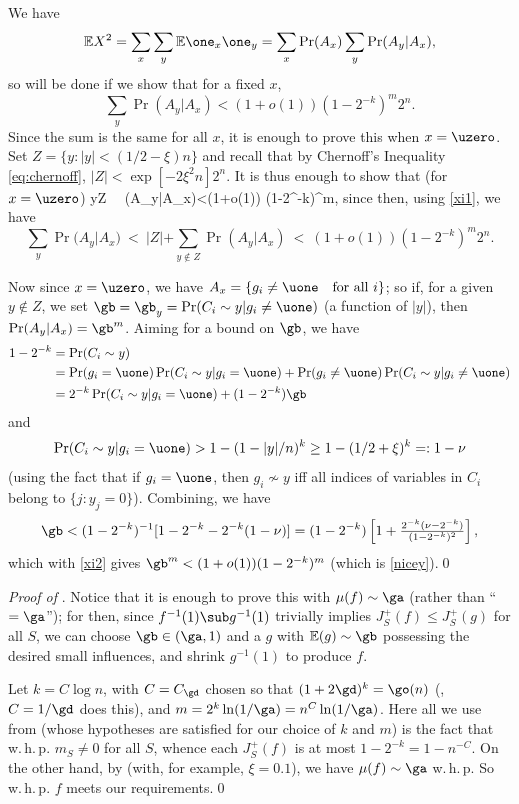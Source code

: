 We have
$$
\mathbb E  X^2 = \sum_x\sum_y\mathbb E  \one_x\one_y =\sum_x\Pr(A_x)\sum_y\Pr(A_y|A_x),
$$
so will be done if we show that for a fixed $x$,
$$ 
\sum_y\Pr(A_y|A_x) <(1+o(1)) (1-2^{-k})^m2^n.
$$ 
Since the sum is the same for all $x$, it is enough %
to prove this when $x=\uzero$.
Set $Z=\{y:|y|<(1/2-\xi)n\}$ and recall 
%
that by Chernoff's Inequality \eqref{eq:chernoff}, 
%
%
%
%
$|Z|<\exp[-2\xi^2n]2^n$.
It is thus enough to show that (for $x=\uzero$)
y\not\in Z ~\Ra~\Pr(A_y|A_x)<(1+o(1)) (1-2^{-k})^m,
\enq
since then, using \eqref{xi1}, we have
$$
\sum_y\Pr(A_y|A_x) ~<~ |Z| + \sum_{y\not\in Z}\Pr(A_y|A_x)
~<~ (1+o(1)) (1-2^{-k})^m2^n.
$$


Now since $x=\uzero$, we have
%
$A_x =\{g_i\neq \uone ~~ \text{ for all } i\}$; %
%
%
so 
if, for a given $y\not\in Z$, we set
$\gb =\gb_y=\Pr(C_i\sim y|g_i\neq \uone)$
(a function of $|y|$),
then $\Pr(A_y|A_x) = \gb^m$.
Aiming for a bound on $\gb$, we have
%
\begin{align*}
1-2^{-k}&=\Pr(C_i\sim y) \\
&=
\Pr(g_i=\uone)\Pr(C_i\sim y|g_i=\uone)
+ \Pr(g_i\neq\uone)\Pr(C_i\sim y|g_i\neq \uone)\\
&= 2^{-k}\Pr(C_i\sim y|g_i=\uone) +(1-2^{-k})\gb
\end{align*}
and
$$\Pr(C_i\sim y|g_i=\uone) > 1 - (1-|y|/n)^k
\geq 1-(1/2+\xi)^k=:1-\nu
$$
(using the fact that if
$g_i=\uone$, then $g_i\not\sim y$
iff all indices of
variables in $C_i$ belong to $\{j:y_j=0\}$).
Combining, we have
$$
\gb < (1-2^{-k})^{-1}[1-2^{-k} - 2^{-k}(1-\nu)]
=(1-2^{-k})\left[1+\tfrac{2^{-k}(\nu -2^{-k})}{(1-2^{-k})^2}\right],
$$
which with \eqref{xi2} gives
$\gb^m < (1+o(1))(1-2^{-k})^m$ (which is \eqref{nicey}).\qed

\mn
\emph{Proof of }.    %
Notice that it is %
enough to prove this with $\mu(f) \sim \ga$
(rather than ``$=\ga$'');
for then,
since $f^{-1}(1)\sub g^{-1}(1)$ trivially implies
$J_S^+(f)\leq J_S^+(g)$ for all $S$, we can
choose
$\gb\in (\ga,1)$ and a $g$ with $\mathbb E (g)\sim \gb$
possessing the desired small influences, and
shrink $g^{-1}(1)$ to produce $f$.


Let $k=C\log n$, with $C=C_\gd$ chosen so that
$(1+2\gd)^k=\go(n)$ (\eg, $C=1/\gd$ does this),
and
$m = 2^k \ln (1/\ga)=n^C\ln (1/\ga)$.
Here all we use from 
(whose hypotheses are satisfied for our choice of $k$ and $m$)
is the fact that
w.\,h.\,p. $m_S\neq 0$ for all $S$,
whence each $J_S^+(f)$ is at most
$1-2^{-k}=1-n^{-C}$.
On the other hand, by 
(with, for example, $\xi=0.1$), we have
$\mu(f) \sim \ga$ w.\,h.\,p.
So w.\,h.\,p. $f$ meets our requirements.\qed


